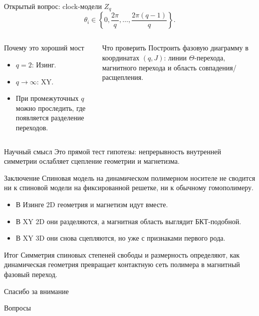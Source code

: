 \documentclass[t,aspectratio=169]{beamer}
\begin{document}
\begin{frame}{Открытый вопрос: clock-модели \(Z_q\)}
  \small
  \[
    \theta_i\in\left\{0,\frac{2\pi}{q},\dots,\frac{2\pi(q-1)}{q}\right\}.
  \]
  \begin{columns}[T,onlytextwidth]
    \begin{block}{Почему это хороший мост}
      \begin{itemize}
        \item \(q=2\): Изинг.
        \item \(q\to\infty\): XY.
        \item При промежуточных \(q\) можно проследить, где появляется разделение переходов.
      \end{itemize}
    \end{block}
    \begin{block}{Что проверить}
      Построить фазовую диаграмму в координатах \((q,J)\): линии \(\Theta\)-перехода, магнитного перехода и область совпадения/расщепления.
    \end{block}
  \end{columns}
  \begin{block}{Научный смысл}
    Это прямой тест гипотезы: непрерывность внутренней симметрии ослабляет сцепление геометрии и магнетизма.
  \end{block}
\end{frame}

\begin{frame}{Заключение}
  \large
  Спиновая модель на динамическом полимерном носителе не сводится ни к спиновой модели на фиксированной решетке, ни к обычному гомополимеру.

  \vspace{0.8em}
  \normalsize
  \begin{itemize}
    \item В Изинге 2D геометрия и магнетизм идут вместе.
    \item В XY 2D они разделяются, а магнитная область выглядит БКТ-подобной.
    \item В XY 3D они снова сцепляются, но уже с признаками первого рода.
  \end{itemize}

  \vspace{0.8em}
  \begin{block}{Итог}
    Симметрия спиновых степеней свободы и размерность определяют, как динамическая геометрия превращает контактную сеть полимера в магнитный фазовый переход.
  \end{block}
\end{frame}

\begin{frame}[plain]
  \centering
  \vspace{2.5cm}
  {\Large Спасибо за внимание}

  \vspace{1cm}
  {\small Вопросы}
\end{frame}
\end{document}
